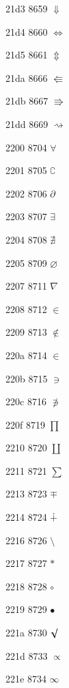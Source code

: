 \documentclass[11pt]{article}
\begin{document}
21d3 8659 \ensuremath{\Downarrow}

21d4 8660 \ensuremath{\Leftrightarrow}

21d5 8661 \ensuremath{\Updownarrow}

21da 8666 \ensuremath{\Lleftarrow}

21db 8667 \ensuremath{\Rrightarrow}

21dd 8669 \ensuremath{\rightsquigarrow}





2200 8704 \ensuremath{\forall}

2201 8705 \ensuremath{\complement}

2202 8706 \ensuremath{\partial}

2203 8707 \ensuremath{\exists}

2204 8708 \ensuremath{\nexists}

2205 8709 \ensuremath{\varnothing}

2207 8711 \ensuremath{\nabla}

2208 8712 \ensuremath{\in}

2209 8713 \ensuremath{\notin}

220a 8714 \ensuremath{\in}

220b 8715 \ensuremath{\ni}

220c 8716 \ensuremath{\not\ni}

220f 8719 \ensuremath{\prod}

2210 8720 \ensuremath{\coprod}

2211 8721 \ensuremath{\sum}


2213 8723 \ensuremath{\mp}

2214 8724 \ensuremath{\dotplus}

2216 8726 \ensuremath{\setminus}

2217 8727 \ensuremath{\ast}

2218 8728 \ensuremath{\circ}

2219 8729 \ensuremath{\bullet}

221a 8730 \ensuremath{\surd}

221d 8733 \ensuremath{\propto}

221e 8734 \ensuremath{\infty}

\end{document}
